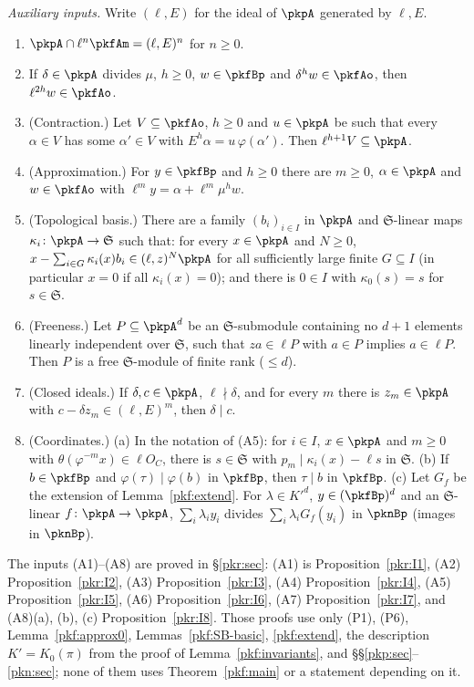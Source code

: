 \documentclass[10pt]{amsart}
\theoremstyle{definition}
\theoremstyle{remark}
\begin{document}
\emph{Auxiliary inputs.} Write $(\ell,E)$ for the ideal of $\pkpA$ generated by $\ell,E$.
\begin{enumerate}
\item[(A1)] $\pkpA\cap\ell^n\pkfAm=(\ell,E)^n$ for $n\ge0$.
\item[(A2)] If $\delta\in\pkpA$ divides $\mu$, $h\ge0$, $w\in\pkfBp$ and $\delta^hw\in\pkfAo$, then
$\ell^{2h}w\in\pkfAo$.
\item[(A3)] (Contraction.) Let $V\subseteq\pkfAo$, $h\ge0$ and $u\in\pkpA$ be such that every $\alpha\in V$
has some $\alpha'\in V$ with $E^h\alpha=u\,\varphi(\alpha')$. Then $\ell^{h+1}V\subseteq\pkpA$.
\item[(A4)] (Approximation.) For $y\in\pkfBp$ and $h\ge0$ there are $m\ge0$, $\alpha\in\pkpA$ and
$w\in\pkfAo$ with $\ell^my=\alpha+\ell^m\mu^hw$.
\item[(A5)] (Topological basis.) There are a family $(b_i)_{i\in I}$ in $\pkpA$ and $\mathfrak S$-linear
maps $\kappa_i\colon\pkpA\to\mathfrak S$ such that: for every $x\in\pkpA$ and $N\ge0$, $x-\sum_{i\in
G}\kappa_i(x)b_i\in(\ell,z)^N\pkpA$ for all sufficiently large finite $G\subseteq I$ (in particular
$x=0$ if all $\kappa_i(x)=0$); and there is $0\in I$ with $\kappa_0(s)=s$ for $s\in\mathfrak S$.
\item[(A6)] (Freeness.) Let $P\subseteq\pkpA^d$ be an $\mathfrak S$-submodule containing no $d+1$
elements linearly independent over $\mathfrak S$, such that $za\in\ell P$ with $a\in P$ implies
$a\in\ell P$. Then $P$ is a free $\mathfrak S$-module of finite rank ($\le d$).
\item[(A7)] (Closed ideals.) If $\delta,c\in\pkpA$, $\ell\nmid\delta$, and for every $m$ there is
$z_m\in\pkpA$ with $c-\delta z_m\in(\ell,E)^m$, then $\delta\mid c$.
\item[(A8)] (Coordinates.) (a) In the notation of (A5): for $i\in I$, $x\in\pkpA$ and $m\ge0$ with
$\theta(\varphi^{-m}x)\in\ell O_C$, there is $s\in\mathfrak S$ with $p_m\mid\kappa_i(x)-\ell s$ in
$\mathfrak S$. (b) If $b\in\pkfBp$ and $\varphi(\tau)\mid\varphi(b)$ in $\pkfBp$, then $\tau\mid b$ in
$\pkfBp$. (c) Let $G_f$ be the extension of Lemma~\ref{pkf:extend}. For $\lambda\in K'^d$,
$y\in(\pkfBp)^d$ and an $\mathfrak S$-linear $f\colon\pkpA\to\pkpA$, $\sum_i\lambda_iy_i$ divides
$\sum_i\lambda_iG_f(y_i)$ in $\pknBp$ (images in $\pknBp$).
\end{enumerate}

The inputs (A1)--(A8) are proved in \S\ref{pkr:sec}: (A1) is Proposition~\ref{pkr:I1}, (A2)
Proposition~\ref{pkr:I2}, (A3) Proposition~\ref{pkr:I3}, (A4) Proposition~\ref{pkr:I4}, (A5)
Proposition~\ref{pkr:I5}, (A6) Proposition~\ref{pkr:I6}, (A7) Proposition~\ref{pkr:I7}, and (A8)(a),
(b), (c) Proposition~\ref{pkr:I8}. Those proofs use only (P1), (P6), Lemma~\ref{pkf:approx0},
Lemmas~\ref{pkf:SB-basic}, \ref{pkf:extend}, the description $K'=K_0(\pi)$ from the proof of
Lemma~\ref{pkf:invariants}, and \S\S\ref{pkp:sec}--\ref{pkn:sec}; none of them uses
Theorem~\ref{pkf:main} or a statement depending on it.
\end{document}
